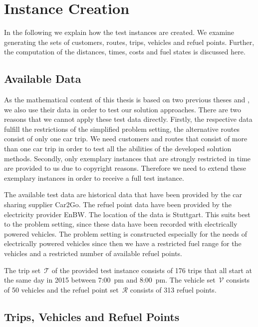 \chapter{Instance Creation}
\label{ch:instance_creation}

In the following we explain how the test instances are created. We examine generating the sets of customers, routes, trips, vehicles and refuel points. Further, the computation of the distances, times, costs and fuel states is discussed here. 

\section{Available Data}

As the mathematical content of this thesis is based on two previous theses \cite{Kaiser} and \cite{Knoll}, we also use their data in order to test our solution approaches. There are two reasons that we cannot apply these test data directly. Firstly, the respective data fulfill the restrictions of the simplified problem setting, \ie the alternative routes consist of only one car trip. We need customers and routes that consist of more than one car trip in order to test all the abilities of the developed solution methods. Secondly, only exemplary instances that are strongly restricted in time are provided to us due to copyright reasons. Therefore we need to extend these exemplary instances in order to receive a full test instance. 

The available test data are historical data that have been provided by the car sharing supplier Car2Go. The refuel point data have been provided by the electricity provider EnBW. The location of the data is Stuttgart. This suits best to the problem setting, since these data have been recorded with electrically powered vehicles. The problem setting is constructed especially for the needs of electrically powered vehicles since then we have a restricted fuel range for the vehicles and a restricted number of available refuel points.

The trip set~$\mathcal{T}$ of the provided test instance consists of 176 trips that all start at the same day in 2015 between 7:00~pm and 8:00~pm. The vehicle set~$\mathcal{V}$ consists of 50 vehicles and the refuel point set~$\mathcal{R}$ consists of 313 refuel points.

\section{Trips, Vehicles and Refuel Points}
\label{sec:trip_creation}


